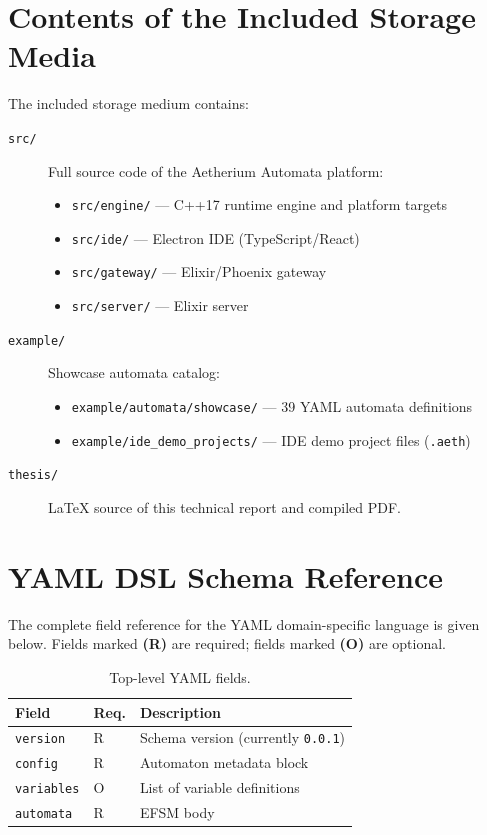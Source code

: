 
\chapter{Contents of the Included Storage Media}
\label{app:media}

The included storage medium contains:

\begin{description}
  \item[\texttt{src/}] Full source code of the Aetherium Automata platform:
    \begin{itemize}
      \item \texttt{src/engine/} --- C++17 runtime engine and platform targets
      \item \texttt{src/ide/} --- Electron IDE (TypeScript/React)
      \item \texttt{src/gateway/} --- Elixir/Phoenix gateway
      \item \texttt{src/server/} --- Elixir server
    \end{itemize}
  \item[\texttt{example/}] Showcase automata catalog:
    \begin{itemize}
      \item \texttt{example/automata/showcase/} --- 39 YAML automata definitions
      \item \texttt{example/ide\_demo\_projects/} --- IDE demo project files (\texttt{.aeth})
    \end{itemize}
  \item[\texttt{thesis/}] \LaTeX{} source of this technical report and compiled PDF.
\end{description}

\chapter{YAML DSL Schema Reference}
\label{app:schema}

The complete field reference for the YAML domain-specific language is given below.
Fields marked \textbf{(R)} are required; fields marked \textbf{(O)} are optional.

\begin{table}[!htbp]
  \centering
  \caption{Top-level YAML fields.}
  \label{tab:app-toplevel}
  \vskip6pt
  \begin{tabularx}{\textwidth}{llX}
    \toprule
    Field & Req. & Description \\
    \midrule
    \texttt{version}   & R & Schema version (currently \texttt{0.0.1}) \\
    \texttt{config}    & R & Automaton metadata block \\
    \texttt{variables} & O & List of variable definitions \\
    \texttt{automata}  & R & EFSM body \\
    \bottomrule
  \end{tabularx}
\end{table}

